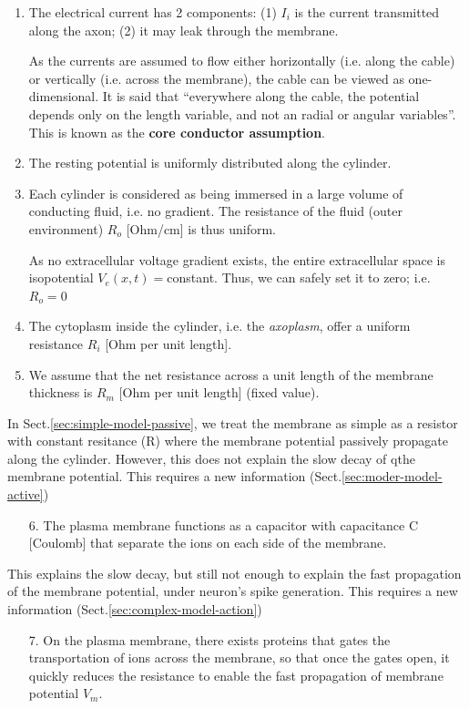\begin{enumerate}
  \item The electrical current has 2 components:
  (1) $I_i$ is the current transmitted  along the axon; (2) it may leak through the
  membrane.
  
  As the currents are assumed to flow either horizontally (i.e. along the
cable) or vertically (i.e. across the membrane), the cable can be viewed
as one-dimensional. It is said that ``everywhere along the cable, the potential
depends only on the length variable, and not an radial or angular variables''.
This is known as the {\bf core conductor assumption}.

  \item The resting potential is uniformly distributed along the cylinder.
  
  \item Each cylinder is considered as being immersed in a large volume of
  conducting fluid, i.e. no gradient. The resistance of the fluid (outer
  environment) $R_o$ [Ohm/cm] is thus uniform.
  
  As no extracellular voltage gradient exists, the entire extracellular
  space is isopotential $V_e(x,t) = $constant. Thus, we can safely set it to
  zero; i.e. $R_o = 0$
  
  \item The cytoplasm inside the cylinder, i.e. the {\it axoplasm},
offer a uniform resistance $R_i$ [Ohm per unit length].

  \item We assume that the net resistance across a unit
  length of the membrane thickness is $R_m$ [Ohm per unit length] (fixed value).
\end{enumerate}

In Sect.\ref{sec:simple-model-passive}, we treat the membrane as simple as a
resistor with constant resitance (R) where the membrane potential passively
propagate along the cylinder. However, this does not explain the slow decay of
qthe membrane potential. This requires a new information
(Sect.\ref{sec:moder-model-active})

\begin{enumerate}
  \item [6.] The plasma membrane functions as a capacitor with capacitance C
  [Coulomb] that separate the ions on each side of the membrane.  
\end{enumerate}
This explains the slow decay, but still not enough to explain the fast
propagation of the membrane potential, under neuron's spike generation. 
This requires a new information (Sect.\ref{sec:complex-model-action})
\begin{enumerate}
  \item [7.] On the plasma membrane, there exists proteins that gates the
  transportation of ions across the membrane, so that once the gates open, it
  quickly reduces the resistance to enable the fast propagation of membrane
  potential $V_m$.
\end{enumerate}

